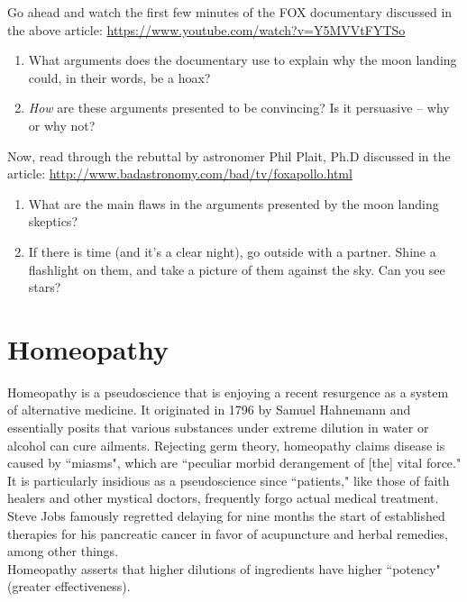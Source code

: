 \documentclass[12pt]{article}
\begin{document}
\noindent Go ahead and watch the first few minutes of the FOX documentary discussed in the above article: \url{https://www.youtube.com/watch?v=Y5MVVtFYTSo} \\

\begin{enumerate}
\item What arguments does the documentary use to explain why the moon landing could, in their words, be a hoax?
\item \textit{How} are these arguments presented to be convincing? Is it persuasive -- why or why not?
\end{enumerate} 

\noindent Now, read through the rebuttal by astronomer Phil Plait, Ph.D discussed in the article: \url{http://www.badastronomy.com/bad/tv/foxapollo.html} \\

\begin{enumerate}
\item What are the main flaws in the arguments presented by the moon landing skeptics? 
\item If there is time (and it's a clear night), go outside with a partner. Shine a flashlight on them, and take a picture of them against the sky. Can you see stars?
\end{enumerate} 

\section{Homeopathy}

Homeopathy is a pseudoscience that is enjoying a recent resurgence as a system of alternative medicine.  It originated in 1796 by Samuel Hahnemann and essentially posits that various substances under extreme dilution in water or alcohol can cure ailments. Rejecting germ theory, homeopathy claims disease is caused by ``miasms", which are ``peculiar morbid derangement of [the] vital force." It is particularly insidious as a pseudoscience since ``patients," like those of faith healers and other mystical doctors, frequently forgo actual medical treatment. Steve Jobs famously regretted delaying for nine months the start of established therapies for his pancreatic cancer in favor of acupuncture and herbal remedies, among other things. \\

\noindent Homeopathy asserts that higher dilutions of ingredients have higher ``potency" (greater effectiveness). \\
\end{document}
